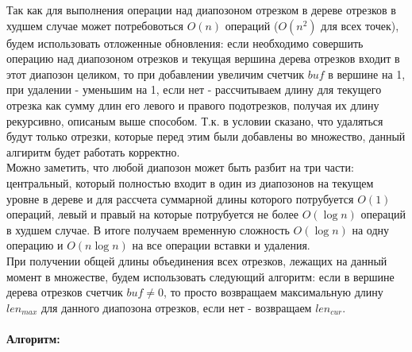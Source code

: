 \documentclass[12pt]{article}
\begin{document}
Так как для выполнения операции над диапозоном отрезком в дереве отрезков в худшем случае может потребовоться $O(n)$ операций ($O(n^2)$ для всех точек), будем использовать отложенные обновления: если необходимо совершить операцию над диапозоном отрезков и текущая вершина дерева отрезков входит в этот диапозон целиком, то при добавлении увеличим счетчик $buf$ в вершине на 1, при удалении - уменьшим на 1, если нет - рассчитываем длину для текущего отрезка как сумму длин его левого и правого подотрезков, получая их длину рекурсивно, описаным выше способом. Т.к. в условии сказано, что удаляться будут только отрезки, которые перед этим были добавлены во множество, данный алгиритм будет работать корректно.\\

Можно заметить, что любой диапозон может быть разбит на три части: центральный, который полностью входит в один из диапозонов на текущем уровне в дереве и для рассчета суммарной длины которого потрубуется $O(1)$ операций, левый и правый на которые потрубуется не более $O(\log n)$ операций в худшем случае. В итоге получаем временную сложность $O(\log n)$ на одну операцию и $O(n \log n)$ на все операции вставки и удаления.\\

При получении общей длины объединения всех отрезков, лежащих на данный момент в множестве, будем использовать следующий алгоритм: если в вершине дерева отрезков счетчик $buf \neq  0$, то просто возвращаем максимальную длину $len_{max}$ для данного диапозона отрезков, если нет - возвращаем $len_{cur}$. 

\paragraph{Алгоритм:}
\end{document}
